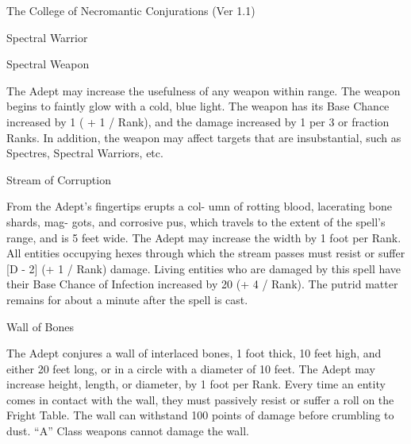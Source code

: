 \begin{Chapter}{The College of Necromantic Conjurations (Ver 1.1)}
\begin{spell}[S-12]{Spectral Warrior }
\begin{effects}
\end{effects}
\end{spell}

\begin{spell}[S-13]{Spectral Weapon }

\begin{effects}
 The  Adept  may  increase  the  usefulness 
of any weapon within range. The weapon begins to 
faintly  glow  with  a  cold,  blue  light.  The  weapon 
has its Base  Chance  increased  by  1  (  +  1  / Rank), 
and  the  damage  increased  by  1  per  3  or  fraction 
Ranks.  In  addition,  the  weapon  may  affect  targets 
that  are  insubstantial,  such  as  Spectres,  Spectral 
Warriors, etc. 

\end{effects}
\end{spell}

\begin{spell}[S-14]{Stream of Corruption }

\begin{effects}
 From  the  Adept’s  fingertips  erupts  a  col-
umn of rotting blood, lacerating bone shards, mag-
gots, and corrosive pus, which travels to the extent 
of the spell’s range, and is 5 feet wide. The Adept 
may  increase  the  width  by  1  foot  per  Rank.  All 
entities occupying hexes through which the stream 
passes  must  resist  or  suffer  [D  -  2]  (+  1  /  Rank) 
damage.  Living  entities  who  are  damaged  by  this 
spell have their Base Chance of Infection increased 
by  20  (+  4  / Rank).  The  putrid  matter  remains  for 
about a minute after the spell is cast. 

\end{effects}
\end{spell}

\begin{spell}[S-15]{Wall of Bones }

\begin{effects}
 The  Adept  conjures  a  wall  of  interlaced 
bones, 1 foot thick, 10 feet high, and either 20 feet 
long, or in a circle with a diameter of 10 feet. The 
Adept may increase height, length, or diameter, by 
1  foot  per  Rank.  Every  time  an  entity  comes  in 
contact with the wall, they must passively resist or 
suffer  a  roll  on  the  Fright  Table.  The  wall  can 
withstand  100  points  of  damage  before  crumbling 
to  dust.  “A”  Class  weapons  cannot  damage  the 
wall. 


\end{effects}
\end{spell}
\end{Chapter}
